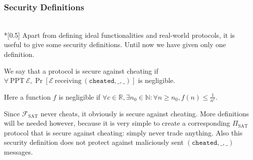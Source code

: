 \subsubsection{Security Definitions} \ \\*[0.5\baselineskip]
  Apart from defining ideal functionalities and real-world protocols, it is useful to give
  some security definitions. Until now we have given only one definition.

  \begin{definition}
  \label{def:nocheatsec}
    We say that a protocol is secure against cheating if $\forall \: \mathrm{PPT} \:
    \mathcal{E}, \Pr\left[\mathcal{E} \: \mathrm{receiving} \: \left(\mathtt{cheated, \_,
    \_}\right)\right]$ is negligible.
  \end{definition}
  \noindent Here a function $f$ is negligible if $\forall c \in \mathbb{R}, \exists n_0
  \in \mathbb{N}: \forall n \geq n_0, f\left(n\right) \leq \frac{1}{n^c}$.

  Since $\mathcal{F}_{\mathrm{SAT}}$ never cheats, it obviously is secure against
  cheating. More definitions will be needed however, because it is very simple to create a
  corresponding $\Pi_{\mathrm{SAT}}$ protocol that is secure against cheating: simply
  never trade anything. Also this security definition does not protect against maliciously
  sent $(\mathtt{cheated}, \_, \_)$ messages.
